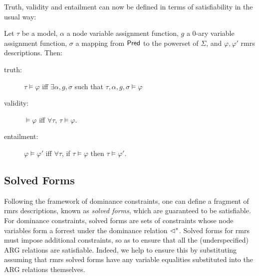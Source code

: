 Truth, validity and entailment can now be defined in terms of
satisfiability 
in the usual way:
\begin{definition}\label{defn:entailment}
Let $\tau$ be a model, $\alpha$ a node variable assignment function,
$g$ a 0-ary variable assignment function, $\sigma$ a mapping from
$\mathsf{Pred}$ to the powerset of $\Sigma$, and $\varphi,\varphi'$ {\sc rmrs}
descriptions.  Then:
\begin{description}
\item   [truth:] $\tau\models \varphi$ iff $\exists \alpha,g,\sigma$  such
  that $\tau,\alpha,g,\sigma\models \varphi$
\item   [validity:] $\models \varphi$ iff $\forall \tau$, $\tau\models \varphi$.
\item   [entailment:] $\varphi\models \varphi'$ iff $\forall \tau$, if
  $\tau\models \varphi$ then $\tau\models \varphi'$.
\end{description}
\end{definition}

\subsection{Solved Forms}

Following the framework of dominance constraints, one can define a fragment
of {\sc rmrs} descriptions, known as {\em solved forms}, which are
guaranteed to be satisfiable.  For dominance constraints, solved forms
are sets of constraints whose node variables form a forrest under the
dominance relation $\lhd^*$.  Solved forms for {\sc rmrs} must impose
additional constraints, so as to ensure that all the (underspecified)
ARG relations are satisfiable.  Indeed, we help to ensure this by
substituting assuming that {\sc rmrs} solved forms have any variable
equalities substituted into the ARG relations themselves.

